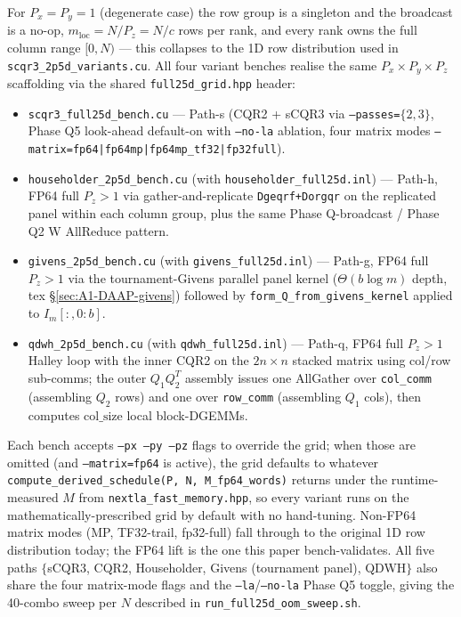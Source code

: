 \documentclass[11pt]{article}
\begin{document}
For $P_x = P_y = 1$ (degenerate case) the row group is a singleton and
the broadcast is a no-op, $m_{\mathrm{loc}} = N/P_z = N/c$ rows per rank,
and every rank owns the full column range $[0, N)$ --- this collapses to
the 1D row distribution used in \texttt{scqr3\_2p5d\_variants.cu}.
All four variant benches realise the same $P_x{\times}P_y{\times}P_z$
scaffolding via the shared \texttt{full25d\_grid.hpp} header:
\begin{itemize}[leftmargin=2em, itemsep=0.2em]
  \item \texttt{scqr3\_full25d\_bench.cu} — Path-s (CQR2 + sCQR3 via
        \texttt{--passes=}$\{2,3\}$, Phase Q5 look-ahead default-on with
        \texttt{--no-la} ablation, four matrix modes
        \texttt{--matrix=fp64|fp64mp|fp64mp\_tf32|fp32full}).
  \item \texttt{householder\_2p5d\_bench.cu} (with
        \texttt{householder\_full25d.inl}) — Path-h, FP64 full
        $P_z>1$ via gather-and-replicate \texttt{Dgeqrf+Dorgqr} on the
        replicated panel within each column group, plus the same
        Phase Q-broadcast / Phase Q2 W AllReduce pattern.
  \item \texttt{givens\_2p5d\_bench.cu} (with
        \texttt{givens\_full25d.inl}) — Path-g, FP64 full $P_z>1$ via
        the tournament-Givens parallel panel kernel ($\Theta(b\log m)$
        depth, tex \S\ref{sec:A1-DAAP-givens}) followed by
        \verb|form_Q_from_givens_kernel| applied to $I_m[:, 0{:}b]$.
  \item \texttt{qdwh\_2p5d\_bench.cu} (with \texttt{qdwh\_full25d.inl})
        — Path-q, FP64 full $P_z>1$ Halley loop with the inner CQR2
        on the $2n{\times}n$ stacked matrix using col/row sub-comms;
        the outer $Q_1 Q_2^T$ assembly issues one AllGather over
        \texttt{col\_comm} (assembling $Q_2$ rows) and one over
        \texttt{row\_comm} (assembling $Q_1$ cols), then computes
        $\mathrm{col\_size}$ local block-DGEMMs.
\end{itemize}
Each bench accepts \texttt{--px --py --pz} flags to override the grid;
when those are omitted (and \texttt{--matrix=fp64} is active), the
grid defaults to whatever
\verb|compute_derived_schedule(P, N, M_fp64_words)| returns under the
runtime-measured $M$ from \texttt{nextla\_fast\_memory.hpp}, so every
variant runs on the mathematically-prescribed grid by default with no
hand-tuning.  Non-FP64 matrix modes (MP, TF32-trail, fp32-full) fall
through to the original 1D row distribution today; the FP64 lift is
the one this paper bench-validates.  All five paths $\{$sCQR3, CQR2,
Householder, Givens (tournament panel), QDWH$\}$ also share the four
matrix-mode flags and the \texttt{--la}/\texttt{--no-la} Phase Q5
toggle, giving the 40-combo sweep per $N$ described in
\texttt{run\_full25d\_oom\_sweep.sh}.
\end{document}
